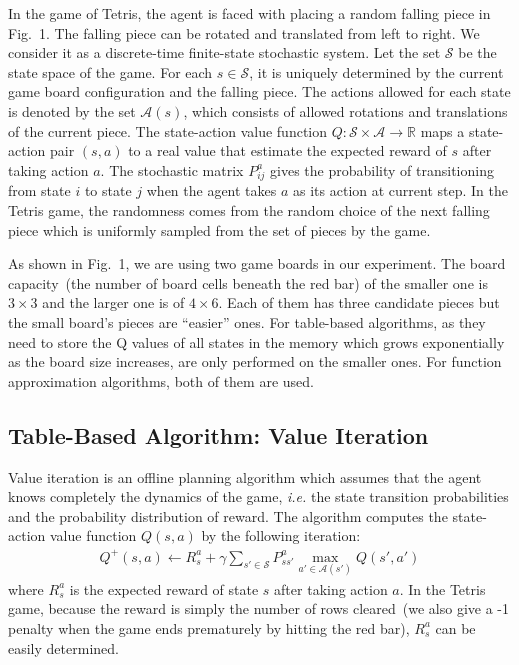 \documentclass{article}
\begin{document}
In the game of Tetris, the agent is faced with placing a random falling piece in Fig.~1. The falling piece can be rotated and translated from left to right. We consider it as a discrete-time finite-state stochastic system. Let the set $\mathcal{S}$ be the state space of the game. For each $s\in\mathcal{S}$, it is uniquely determined by the current game board configuration and the falling piece. The actions allowed for each state is denoted by the set $\mathcal{A}(s)$, which consists of allowed rotations and translations of the current piece. The state-action value function $Q: \mathcal{S\times \mathcal{A}} \rightarrow \mathbb{R}$ maps a state-action pair $(s,a)$ to a real value that estimate the expected reward of $s$ after taking action $a$. The stochastic matrix $P_{ij}^a$ gives the probability of transitioning from state $i$ to state $j$ when the agent takes $a$ as its action at current step. In the Tetris game, the randomness comes from the random choice of the next falling piece which is uniformly sampled from the set of pieces by the game.

As shown in Fig.~1, we are using two game boards in our experiment. The board capacity~(the number of board cells beneath the red bar) of the smaller one is $3\times 3$ and the larger one is of $4\times 6$. Each of them has three candidate pieces but the small board's pieces are ``easier'' ones. For table-based algorithms, as they need to store the Q values of all states in the memory which grows exponentially as the board size increases, are only performed on the smaller ones. For function approximation algorithms, both of them are used.

\subsection{Table-Based Algorithm: Value Iteration}
Value iteration is an offline planning algorithm which assumes that the agent knows completely the dynamics of the game, \textit{i.e.} the state transition probabilities and the probability distribution of reward. The algorithm computes the state-action value function $Q(s,a)$ by the following iteration:
\begin{align}
	\label{eq:VI}
	Q^+(s,a)\leftarrow R_s^a+\gamma\sum_{s'\in\mathcal{S}}P_{ss'}^a \max_{a'\in\mathcal{A}(s')} Q(s',a')
\end{align}
where $R_s^a$ is the expected reward of state $s$ after taking action $a$. In the Tetris game, because the reward is simply the number of rows cleared~(we also give a -1 penalty when the game ends prematurely by hitting the red bar), $R_s^a$ can be easily determined.
\end{document}
